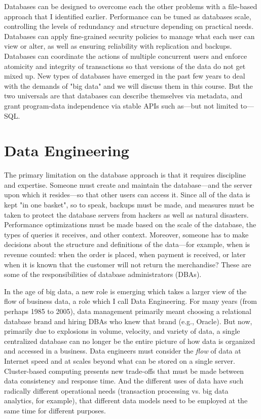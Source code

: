 \documentclass[11pt]{book}
\begin{document}
Databases can be designed to overcome each the other problems with a file-based approach that I identified earlier.  Performance can be tuned as databases scale, controlling the levels of redundancy and structure depending on practical needs.  Databases can apply fine-grained security policies to manage what each user can view or alter, as well as ensuring reliability with replication and backups.  Databases can coordinate the actions of multiple concurrent users and enforce atomicity and integrity of transactions so that versions of the data do not get mixed up.  New types of databases have emerged in the past few years to deal with the demands of "big data" and we will discuss them in this course.  But the two universals are that databases can describe themselves via metadata, and grant program-data independence via stable APIs such as---but not limited to---SQL.

\section{Data Engineering}

The primary limitation on the database approach is that it requires discipline and expertise.  Someone must create and maintain the database---and the server upon which it resides---so that other users can access it.  Since all of the data is kept "in one basket", so to speak, backups must be made, and measures must be taken to protect the database servers from hackers as well as natural disasters.  Performance optimizations must be made based on the scale of the database, the types of queries it receives, and other context.  Moreover, someone has to make decisions about the structure and definitions of the data---for example, when is revenue counted: when the order is placed, when payment is received, or later when it is known that the customer will not return the merchandise?  These are some of the responsibilities of database administrators (DBAs).

In the age of big data, a new role is emerging which takes a larger view of the flow of business data, a role which I call Data Engineering.  For many years (from perhaps 1985 to 2005), data management primarily meant choosing a relational database brand and hiring DBAs who knew that brand (e.g., Oracle).  But now, primarily due to explosions in volume, velocity, and variety of data, a single centralized database can no longer be the entire picture of how data is organized and accessed in a business.  Data engineers must consider the \emph{flow} of data at Internet speed and at scales beyond what can be stored on a single server.  Cluster-based computing presents new trade-offs that must be made between data consistency and response time.  And the different uses of data have such radically different operational needs (transaction processing vs. big data analytics, for example), that different data models need to be employed at the same time for different purposes.
\end{document}
